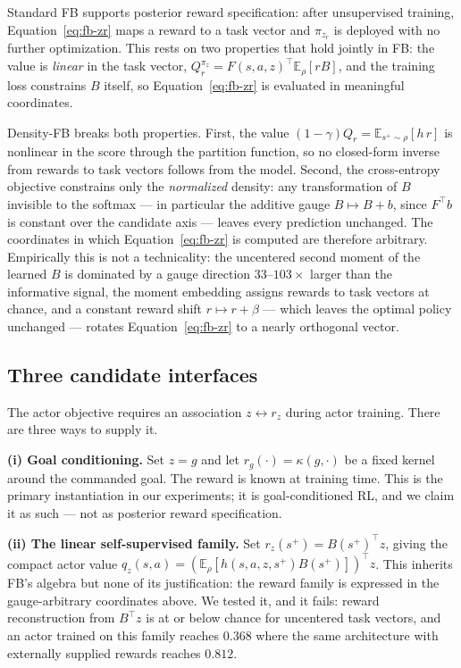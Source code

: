 \documentclass[11pt]{article}
\begin{document}
{Standard FB supports posterior reward specification: after unsupervised training, Equation~\eqref{eq:fb-zr} maps a reward to a task vector and $\pi_{z_r}$ is deployed with no further optimization.
This rests on two properties that hold jointly in FB: the value is \emph{linear} in the task vector, $Q_r^{\pi_z} = F(s,a,z)^\top \mathbb E_\rho[rB]$, and the training loss constrains $B$ itself, so Equation~\eqref{eq:fb-zr} is evaluated in meaningful coordinates.

Density-FB breaks both properties.
First, the value $(1-\gamma) Q_r = \mathbb E_{s^+\sim\rho}[h\, r]$ is nonlinear in the score through the partition function, so no closed-form inverse from rewards to task vectors follows from the model.
Second, the cross-entropy objective constrains only the \emph{normalized} density: any transformation of $B$ invisible to the softmax --- in particular the additive gauge $B \mapsto B + b$, since $F^\top b$ is constant over the candidate axis --- leaves every prediction unchanged.
The coordinates in which Equation~\eqref{eq:fb-zr} is computed are therefore arbitrary.
Empirically this is not a technicality: the uncentered second moment of the learned $B$ is dominated by a gauge direction $33$--$103\times$ larger than the informative signal, the moment embedding assigns rewards to task vectors at chance, and a constant reward shift $r \mapsto r + \beta$ --- which leaves the optimal policy unchanged --- rotates Equation~\eqref{eq:fb-zr} to a nearly orthogonal vector.

\subsection*{Three candidate interfaces}

The actor objective requires an association $z \leftrightarrow r_z$ during actor training.
There are three ways to supply it.

\textbf{(i) Goal conditioning.}
Set $z = g$ and let $r_g(\cdot) = \kappa(g,\cdot)$ be a fixed kernel around the commanded goal.
The reward is known at training time.
This is the primary instantiation in our experiments; it is goal-conditioned RL, and we claim it as such --- not as posterior reward specification.

\textbf{(ii) The linear self-supervised family.}
Set $r_z(s^+) = B(s^+)^\top z$, giving the compact actor value $q_z(s,a) = \left(\mathbb E_\rho[h(s,a,z,s^+) B(s^+)]\right)^\top z$.
This inherits FB's algebra but none of its justification: the reward family is expressed in the gauge-arbitrary coordinates above.
We tested it, and it fails: reward reconstruction from $B^\top z$ is at or below chance for uncentered task vectors, and an actor trained on this family reaches $0.368$ where the same architecture with externally supplied rewards reaches $0.812$.

}
\end{document}
